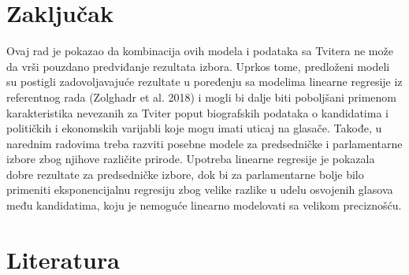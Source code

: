 \section{Zaključak}

Ovaj rad je pokazao da kombinacija ovih modela i podataka sa Tvitera ne može da vrši pouzdano predviđanje rezultata izbora. Uprkos tome, predloženi modeli su postigli zadovoljavajuće rezultate u poređenju sa modelima linearne regresije iz referentnog rada (Zolghadr et al. 2018) i mogli bi dalje biti poboljšani primenom karakteristika nevezanih za Tviter poput biografskih podataka o kandidatima i političkih i ekonomskih varijabli koje mogu imati uticaj na glasače. Takođe, u narednim radovima treba razviti posebne modele za predsedničke i parlamentarne izbore zbog njihove različite prirode. Upotreba linearne regresije je pokazala dobre rezultate za predsedničke izbore, dok bi za parlamentarne bolje bilo primeniti eksponencijalnu regresiju zbog velike razlike u udelu osvojenih glasova među kandidatima, koju je nemoguće linearno modelovati sa velikom preciznošću.

\section{Literatura}

